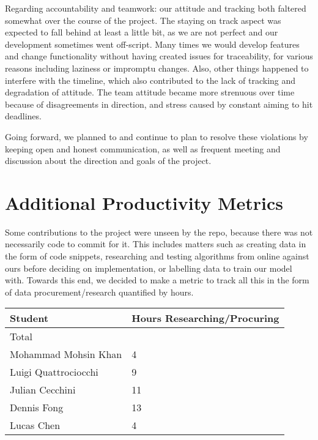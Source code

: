 \documentclass{article}
\begin{document}
Regarding accountability and teamwork: our attitude and tracking both
faltered somewhat over the course of the project. The staying on track aspect
was expected to fall behind at least a little bit, as we are not perfect and
our development sometimes went off-script. Many times we would develop features
and change functionality without having created issues for traceability, for
various reasons including laziness or impromptu changes. Also, other things
happened to interfere with the timeline, which also contributed to the lack of
tracking and degradation of attitude. The team attitude became more strenuous
over time because of disagreements in direction, and stress caused by constant
aiming to hit deadlines.

Going forward, we planned to and continue to plan to resolve these violations
by keeping open and honest communication, as well as frequent meeting and
discussion about the direction and goals of the project.

\section{Additional Productivity Metrics}

Some contributions to the project were unseen by the repo, because there was not
necessarily code to commit for it. This includes matters such as creating data 
in the form of code snippets, researching and testing algorithms from online 
against ours before deciding on implementation, or labelling data to train our 
model with. Towards this end, we decided to make a metric to track all this 
in the form of data procurement/research quantified by hours.

\begin{table}[H]
    \centering
    \begin{tabular}{ll}
    \toprule
    \textbf{Student} & \textbf{Hours Researching/Procuring}\\
    \midrule
    Total & \\
    Mohammad Mohsin Khan & 4\\
    Luigi Quattrociocchi & 9\\
    Julian Cecchini & 11\\
    Dennis Fong & 13\\
    Lucas Chen & 4\\
    \bottomrule
    \end{tabular}
\end{table}
    
\end{document}
